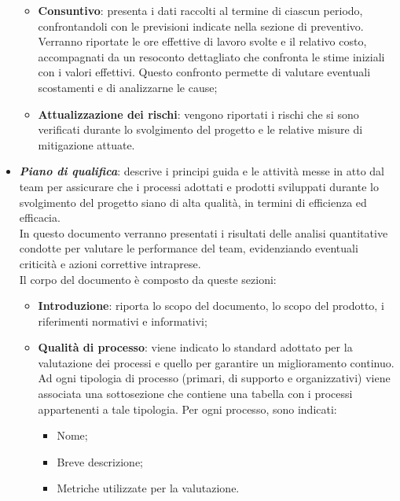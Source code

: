 \begin{itemize}
\begin{itemize}
                  \item \textbf{Consuntivo}: presenta i dati raccolti al termine di ciascun periodo, confrontandoli con le previsioni indicate nella sezione di preventivo. Verranno riportate le ore effettive di lavoro svolte e il relativo costo,
                        accompagnati da un resoconto dettagliato che confronta le stime iniziali con i valori effettivi. Questo confronto permette di valutare eventuali scostamenti e di analizzarne le cause;
                  \item \textbf{Attualizzazione dei rischi}: vengono riportati i rischi che si sono verificati durante lo svolgimento del progetto e le relative misure di mitigazione attuate.
            \end{itemize}

      \item \textit{\textbf{Piano di qualifica}}: descrive i principi guida e le attività messe in atto dal team per assicurare che i processi
            adottati e prodotti sviluppati durante lo svolgimento del progetto siano di alta qualità, in termini di efficienza ed efficacia.\\
            In questo documento verranno presentati i risultati delle analisi quantitative condotte per valutare le performance del team, evidenziando eventuali criticità e azioni correttive intraprese.
            \\Il corpo del documento è composto da queste sezioni:
            \begin{itemize}
                  \item \textbf{Introduzione}: riporta lo scopo del documento, lo scopo del prodotto, i riferimenti normativi e informativi;
                  \item \textbf{Qualità di processo}: viene indicato lo standard adottato per la valutazione dei processi e quello per garantire un miglioramento continuo.\\
                        Ad ogni tipologia di processo (primari, di supporto e organizzativi) viene associata una sottosezione che contiene una tabella con
                        i processi appartenenti a tale tipologia. Per ogni processo, sono indicati:
                        \begin{itemize}
                              \item Nome;
                              \item Breve descrizione;
                              \item Metriche utilizzate per la valutazione.
                        \end{itemize}


\end{itemize}
\end{itemize}
